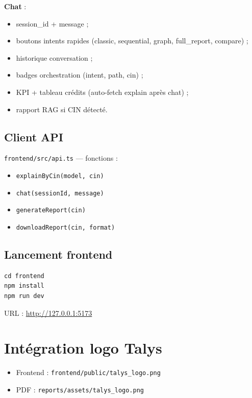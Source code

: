 \textbf{Chat} :
\begin{itemize}[leftmargin=*]
  \item session\_id + message ;
  \item boutons intents rapides (classic, sequential, graph, full\_report, compare) ;
  \item historique conversation ;
  \item badges orchestration (intent, path, cin) ;
  \item KPI + tableau crédits (auto-fetch explain après chat) ;
  \item rapport RAG si CIN détecté.
\end{itemize}

\subsection{Client API}

\texttt{frontend/src/api.ts} — fonctions :
\begin{itemize}[leftmargin=*]
  \item \texttt{explainByCin(model, cin)}
  \item \texttt{chat(sessionId, message)}
  \item \texttt{generateReport(cin)}
  \item \texttt{downloadReport(cin, format)}
\end{itemize}

\subsection{Lancement frontend}

\begin{lstlisting}[caption={Dev server React}]
cd frontend
npm install
npm run dev
\end{lstlisting}

URL : \url{http://127.0.0.1:5173}

\section{Intégration logo Talys}

\begin{itemize}[leftmargin=*]
  \item Frontend : \texttt{frontend/public/talys\_logo.png}
  \item PDF : \texttt{reports/assets/talys\_logo.png}
\end{itemize}

